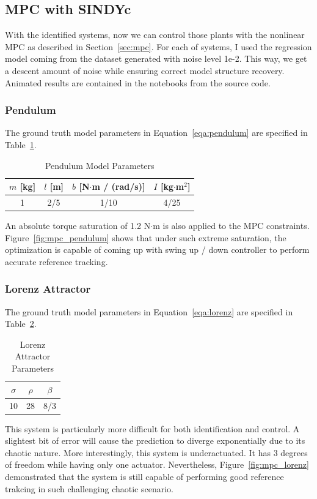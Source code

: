 \documentclass[10pt,twocolumn]{article}
\begin{document}
\subsection{MPC with SINDYc}

With the identified systems, now we can control those plants with the nonlinear MPC as
described in Section~\ref{sec:mpc}. For each of systems, I used the regression model coming
from the dataset generated with noise level 1e-2. This way, we get a descent amount of
noise while ensuring correct model structure recovery. Animated results are contained
in the notebooks from the source code.

\subsubsection{Pendulum}

The ground truth model parameters in Equation~\ref{eqa:pendulum}
are specified in Table~\ref{tbl:pendulum_params}.
\begin{table}[h]
  \centering
  \begin{tabular}{cccc}
    \toprule
    $m$ [kg] & $l$ [m] & $b$ [N$\cdot$m / (rad/s)] & $I$ [kg$\cdot$m$^2$] \\
    \midrule
    1 & 2/5 & 1/10 & 4/25 \\
    \bottomrule
  \end{tabular}
  \caption{Pendulum Model Parameters}
  \label{tbl:pendulum_params}
\end{table}
An absolute torque saturation of 1.2 N$\cdot$m is also applied to the MPC constraints.
Figure~\ref{fig:mpc_pendulum} shows that under such extreme saturation, the optimization
is capable of coming up with swing up / down controller to perform accurate reference tracking.

\subsubsection{Lorenz Attractor}

The ground truth model parameters in Equation~\ref{eqa:lorenz} are specified in
Table~\ref{tbl:lorenz_params}.
\begin{table}[h]
  \centering
  \begin{tabular}{ccc}
    \toprule
    $\sigma$ & $\rho$ & $\beta$ \\
    \midrule
    10 & 28 & 8/3 \\
    \bottomrule
  \end{tabular}
  \caption{Lorenz Attractor Parameters}
  \label{tbl:lorenz_params}
\end{table}
This system is particularly more difficult for both identification and control. A slightest
bit of error will cause the prediction to diverge exponentially due to its chaotic nature.
More interestingly, this system is underactuated. It has 3 degrees of freedom while having
only one actuator. Nevertheless, Figure~\ref{fig:mpc_lorenz} demonstrated that the system
is still capable of performing good reference trakcing in such challenging chaotic scenario.
\end{document}
